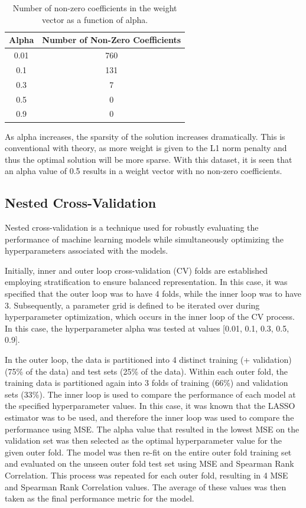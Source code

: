 \documentclass[12pt]{article}
\begin{document}
\begin{table}[H]
    \centering
    \begin{tabular}{|c|c|}
        \hline 
        \textbf{Alpha} & \textbf{Number of Non-Zero Coefficients} \\
        \hline
        0.01 & 760 \\
        0.1 & 131 \\
        0.3 & 7 \\
        0.5 & 0 \\
        0.9 & 0 \\
        \hline
    \end{tabular}
    \caption{Number of non-zero coefficients in the weight vector as a function of alpha.}
    \label{tab:lasso_alpha}
\end{table}

\vspace{-0.5cm}

As alpha increases, the sparsity of the solution increases dramatically. This is conventional with theory, as more weight is given to the L1 norm penalty and thus the optimal solution will be more sparse. With this dataset, it is seen that an alpha value of 0.5 results in a weight vector with no non-zero coefficients. 

\subsection{Nested Cross-Validation}
Nested cross-validation is a technique used for robustly evaluating the performance of machine learning models while simultaneously optimizing the hyperparameters associated with the models. 

Initially, inner and outer loop cross-validation (CV) folds are established employing stratification to ensure balanced representation. In this case, it was specified that the outer loop was to have 4 folds, while the inner loop was to have 3. Subsequently, a parameter grid is defined to be iterated over during hyperparameter optimization, which occurs in the inner loop of the CV process. In this case, the hyperparameter alpha was tested at values [0.01, 0.1, 0.3, 0.5, 0.9].

In the outer loop, the data is partitioned into 4 distinct training (+ validation) (75\% of the data) and test sets (25\% of the data). Within each outer fold, the training data is partitioned again into 3 folds of training (66\%) and validation sets (33\%). The inner loop is used to compare the performance of each model at the specified hyperparameter values. In this case, it was known that the LASSO estimator was to be used, and therefore the inner loop was used to compare the performance using MSE. The alpha value that resulted in the lowest MSE on the validation set was then selected as the optimal hyperparameter value for the given outer fold. The model was then re-fit on the entire outer fold training set and evaluated on the unseen outer fold test set using MSE and Spearman Rank Correlation. This process was repeated for each outer fold, resulting in 4 MSE and Spearman Rank Correlation values. The average of these values was then taken as the final performance metric for the model.
\end{document}
